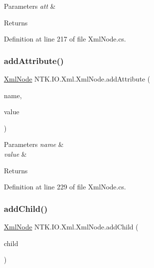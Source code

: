 \begin{DoxyParams}{Parameters}
{\em att} & \\
\hline
\end{DoxyParams}
\begin{DoxyReturn}{Returns}

\end{DoxyReturn}


Definition at line 217 of file Xml\+Node.\+cs.

\mbox{\label{class_n_t_k_1_1_i_o_1_1_xml_1_1_xml_node_abb83c88c7af84057a09eebb2dce671bb}} 
\subsubsection{\texorpdfstring{addAttribute()}{addAttribute()}\hspace{0.1cm}{\footnotesize\ttfamily [2/2]}}
{\footnotesize\ttfamily \mbox{\hyperlink{class_n_t_k_1_1_i_o_1_1_xml_1_1_xml_node}{Xml\+Node}} N\+T\+K.\+I\+O.\+Xml.\+Xml\+Node.\+add\+Attribute (\begin{DoxyParamCaption}\item[{String}]{name,  }\item[{String}]{value }\end{DoxyParamCaption})}






\begin{DoxyParams}{Parameters}
{\em name} & \\
\hline
{\em value} & \\
\hline
\end{DoxyParams}
\begin{DoxyReturn}{Returns}

\end{DoxyReturn}


Definition at line 229 of file Xml\+Node.\+cs.

\mbox{\label{class_n_t_k_1_1_i_o_1_1_xml_1_1_xml_node_a36829cc3fa2852dff02b8f56e30b8bd7}} 
\subsubsection{\texorpdfstring{addChild()}{addChild()}\hspace{0.1cm}{\footnotesize\ttfamily [1/3]}}
{\footnotesize\ttfamily \mbox{\hyperlink{class_n_t_k_1_1_i_o_1_1_xml_1_1_xml_node}{Xml\+Node}} N\+T\+K.\+I\+O.\+Xml.\+Xml\+Node.\+add\+Child (\begin{DoxyParamCaption}\item[{\mbox{\hyperlink{class_n_t_k_1_1_i_o_1_1_xml_1_1_xml_node}{Xml\+Node}}}]{child }\end{DoxyParamCaption})}



